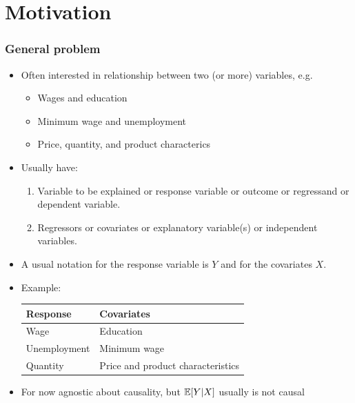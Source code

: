 \section{Motivation}
\frame{\sectionpage}
\begin{frame}[allowframebreaks]
  \frametitle{General problem}
  \begin{itemize}
  \item Often interested in relationship between two (or more)
    variables, e.g.\
    \begin{itemize}
    \item Wages and education
    \item Minimum wage and unemployment
    \item Price, quantity, and product characterics
    \end{itemize}
  \item Usually have:
    \begin{enumerate}
    \item Variable to be explained or \alert{response variable} or
      \alert{outcome} or \alert{regressand} or \alert{dependent
        variable}.
    \item \alert{Regressors} or \alert{covariates} or \alert{explanatory variable(s)} or \alert{independent
        variables}. 
    \end{enumerate}
\item A usual notation for the response variable is $Y$ and for the
  covariates $X$.
\item \alert{Example}:

\medskip

    \begin{tabular}{l|l} 
\hline
  {\textbf{Response}} & {\textbf{Covariates}} \\
\hline
      Wage & Education \\
      Unemployment & Minimum wage \\
      Quantity & Price  and product characteristics \\
\hline
    \end{tabular}

  \item For now agnostic about causality, but $\mathbb{E}[Y|X]$ usually is
    not causal
  \end{itemize}
\end{frame}

